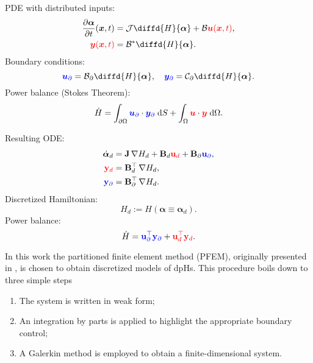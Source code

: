 \begin{tcbraster}[raster columns=2, raster equal height]
\begin{tcolorbox}[width=0.4\textwidth, nobeforeafter, colframe=theme,title=Infinite dimensional pH system]%
	PDE with distributed inputs:
	\begin{align*}
	\diffp{\bm{\alpha}}{t}(\bm{x}, t) &= \mathcal{J} {\displaystyle \diffd{H}{\bm{\alpha}}}+ \mathcal{B} \textcolor{red}{\bm{u}(\bm{x}, t)}, \\
	\textcolor{red}{\bm{y}(\bm{x}, t)} &= \mathcal{B}^* {\displaystyle \diffd{H}{\bm{\alpha}}}.
	\end{align*}
	Boundary conditions: 
	\[\textcolor{blue}{\bm{u}_\partial} = \mathcal{B}_\partial{\displaystyle \diffd{H}{\bm{\alpha}}}, \quad \textcolor{blue}{\bm{y}_\partial} = \mathcal{C}_\partial {\displaystyle \diffd{H}{\bm{\alpha}}}. \]
	Power balance (Stokes Theorem): 
	\[ \dot{H} = \displaystyle \int_{\partial \Omega} \textcolor{blue}{\bm{u}_\partial} \cdot \textcolor{blue}{\bm{y}_\partial} \d{S} +  \int_{\Omega} \textcolor{red}{\bm{u}} \cdot \textcolor{red}{\bm{y}} \d{\Omega}.
	\]
\end{tcolorbox} 
\begin{tcolorbox}[width=0.4\textwidth, nobeforeafter,  colframe=theme,title=Structure-preserving discretization]%
	Resulting ODE:
	\begin{align*}
	\dot{\bm{\alpha}}_d &= \mathbf{J} \, {\nabla {H}_d} + \mathbf{B}_d \textcolor{red}{\mathbf{u}_d} + \mathbf{B}_\partial \textcolor{blue}{\mathbf{u}_\partial}, \\
	\textcolor{red}{\mathbf{y}_d} &= \mathbf{B}_d^\top \, {\nabla {H}_d}, \\
	\textcolor{blue}{\mathbf{y}_\partial} &= \mathbf{B}_\partial^\top \,{\nabla {H}_d}.
	\end{align*}
	Discretized Hamiltonian:
	\[
	H_d := H(\bm{\alpha} \equiv \bm{\alpha}_d).
	\]
	Power balance: 
	\[ \dot{H} = \textcolor{blue}{\mathbf{u}_\partial^\top \mathbf{y}_\partial} +  \textcolor{red}{\mathbf{u}_d^\top \mathbf{y}_d}.
	\]
\end{tcolorbox}
\end{tcbraster}
\vspace{.5cm}
In this work the partitioned finite element method (PFEM), originally presented in \cite{cardoso2018pfem,cardoso2019partitioned}, is chosen to obtain discretized models of dpHs. This procedure boils down to three simple steps
\begin{enumerate}
	\item The system is written in weak form; 
	\item An integration by parts is applied to highlight the appropriate boundary control;
	\item A Galerkin method is employed to obtain a finite-dimensional system.
\end{enumerate}

